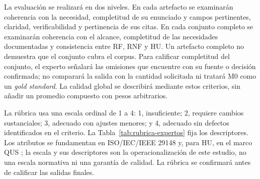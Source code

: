 La evaluación se realizará en dos niveles. En cada artefacto se examinarán coherencia con la necesidad, completitud de su enunciado y campos pertinentes, claridad, verificabilidad y pertinencia de sus citas. En cada conjunto completo se examinarán coherencia con el alcance, completitud de las necesidades documentadas y consistencia entre RF, RNF y HU. Un artefacto completo no demuestra que el conjunto cubra el corpus. Para calificar completitud del conjunto, el experto señalará las omisiones que encuentre con su fuente o decisión confirmada; no comparará la salida con la cantidad solicitada ni tratará M0 como un \emph{gold standard}. La calidad global se describirá mediante estos criterios, sin añadir un promedio compuesto con pesos arbitrarios.

La rúbrica usa una escala ordinal de 1 a 4: 1, insuficiente; 2, requiere cambios sustanciales; 3, adecuado con ajustes menores; y 4, adecuado sin defectos identificados en el criterio. La Tabla~\ref{tab:rubrica-expertos} fija los descriptores. Los atributos se fundamentan en ISO/IEC/IEEE 29148 y, para HU, en el marco QUS \cite{iso29148,lucassen2016}; la escala y sus descriptores son la operacionalización de este estudio, no una escala normativa ni una garantía de calidad. La rúbrica se confirmará antes de calificar las salidas finales.

